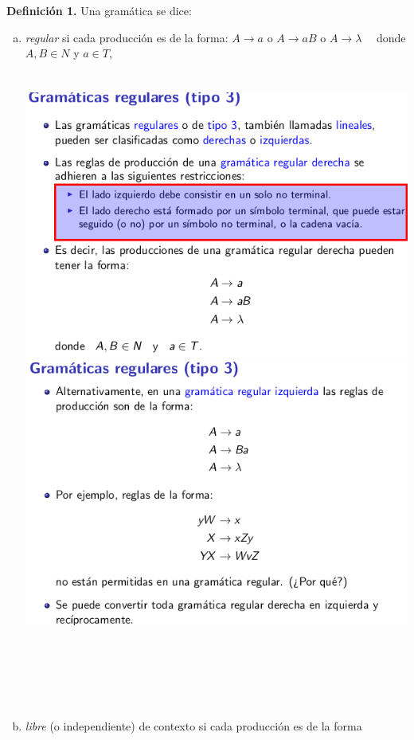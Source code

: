 \documentclass{article}
\begin{document}
\textbf{Definición 1.} Una gramática se dice:
\begin{enumerate}[(a)]
\item
    \textit{regular} si cada producción es de la forma:
    $A \rightarrow a$ o $A \rightarrow aB$ o $A \rightarrow \lambda \quad$ 
    donde $A, B \in N$ y $a \in T$, \\ \\ \\
    \includegraphics[scale=0.4]{3.png}
    \includegraphics[scale=0.4]{2.png} \\ \\ \\ \\ \\ \\
\item
    \textit{libre} (o independiente) de contexto si cada producción es de la forma 

\end{enumerate}
\end{document}
